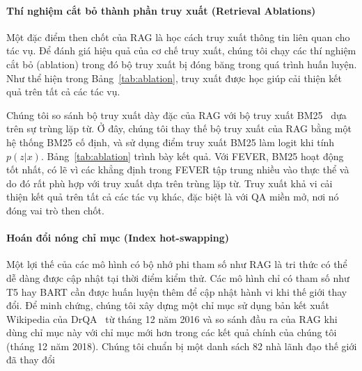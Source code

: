 \documentclass[10pt,letterpaper]{article}
\begin{document}
\paragraph{Thí nghiệm cắt bỏ thành phần truy xuất (Retrieval Ablations)}
Một đặc điểm then chốt của RAG là học cách truy xuất thông tin liên quan cho
tác vụ. Để đánh giá hiệu quả của cơ chế truy xuất, chúng tôi chạy các thí
nghiệm cắt bỏ (ablation) trong đó bộ truy xuất bị đóng băng trong quá trình
huấn luyện. Như thể hiện trong Bảng~\ref{tab:ablation}, truy xuất được học giúp
cải thiện kết quả trên tất cả các tác vụ.

Chúng tôi so sánh bộ truy xuất dày đặc của RAG với bộ truy xuất
BM25~\cite{b53} dựa trên sự trùng lặp từ. Ở đây, chúng tôi thay thế bộ truy
xuất của RAG bằng một hệ thống BM25 cố định, và sử dụng điểm truy xuất BM25 làm
logit khi tính $p(z|x)$. Bảng~\ref{tab:ablation} trình bày kết quả. Với FEVER,
BM25 hoạt động tốt nhất, có lẽ vì các khẳng định trong FEVER tập trung nhiều
vào thực thể và do đó rất phù hợp với truy xuất dựa trên trùng lặp từ. Truy
xuất khả vi cải thiện kết quả trên tất cả các tác vụ khác, đặc biệt là với QA
miền mở, nơi nó đóng vai trò then chốt.

\paragraph{Hoán đổi nóng chỉ mục (Index hot-swapping)}
Một lợi thế của các mô hình có bộ nhớ phi tham số như RAG là tri thức có thể dễ
dàng được cập nhật tại thời điểm kiểm thử. Các mô hình chỉ có tham số như T5
hay BART cần được huấn luyện thêm để cập nhật hành vi khi thế giới thay đổi. Để
minh chứng, chúng tôi xây dựng một chỉ mục sử dụng bản kết xuất Wikipedia của
DrQA~\cite{b5} từ tháng 12 năm 2016 và so sánh đầu ra của RAG khi dùng chỉ mục
này với chỉ mục mới hơn trong các kết quả chính của chúng tôi (tháng 12 năm
2018). Chúng tôi chuẩn bị một danh sách 82 nhà lãnh đạo thế giới đã thay đổi
\end{document}
